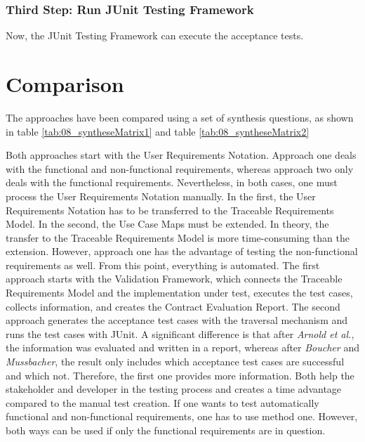 \subsubsection{Third Step: Run JUnit Testing Framework}
Now, the JUnit Testing Framework can execute the acceptance tests.
\newpage
\section{Comparison}

The approaches have been compared using a set of synthesis questions, as shown in table \ref{tab:08_syntheseMatrix1} and table \ref{tab:08_syntheseMatrix2}

Both approaches start with the User Requirements Notation. Approach one deals with the functional and non-functional requirements, whereas approach two only deals with the functional requirements. Nevertheless, in both cases, one must process the User Requirements Notation manually. In the first, the User Requirements Notation has to be transferred to the Traceable Requirements Model. In the second, the Use Case Maps must be extended. In theory, the transfer to the Traceable Requirements Model is more time-consuming than the extension. However, approach one has the advantage of testing the non-functional requirements as well. From this point, everything is automated. The first approach starts with the Validation Framework, which connects the Traceable Requirements Model and the implementation under test, executes the test cases, collects information, and creates the Contract Evaluation Report. The second approach generates the acceptance test cases with the traversal mechanism and runs the test cases with JUnit. A significant difference is that after \textit{Arnold et al.}, the information was evaluated and written in a report, whereas after \textit{Boucher} and \textit{Mussbacher}, the result only includes which acceptance test cases are successful and which not. Therefore, the first one provides more information. Both help the stakeholder and developer in the testing process and creates a time advantage compared to the manual test creation. If one wants to test automatically functional and non-functional requirements, one has to use method one. However, both ways can be used if only the functional requirements are in question.

